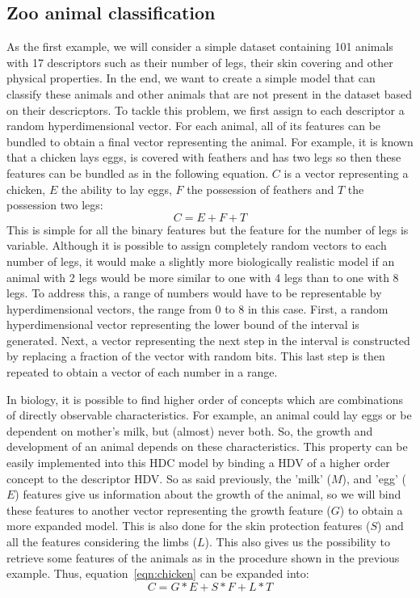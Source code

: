 \subsection*{Zoo animal classification}
As the first example, we will consider a simple dataset\cite{zoo} containing 101 animals with 17 descriptors such as their number of legs, their skin covering and other physical properties. In the end, we want to create a simple model that can classify these animals and other animals that are not present in the dataset based on their descricptors. To tackle this problem, we first assign to each descriptor a random hyperdimensional vector. For each animal, all of its features can be bundled to obtain a final vector representing the animal. For example, it is known that a chicken lays eggs, is covered with feathers and has two legs so then these features can be bundled as in the following equation. $C$ is a vector representing a chicken, $E$ the ability to lay eggs, $F$ the possession of feathers and $T$ the possession two legs:
\begin{equation}\label{eqn:chicken}
    C = E + F + T
\end{equation}
This is simple for all the binary features but the feature for the number of legs is variable. Although it is possible to assign completely random vectors to each number of legs, it would make a slightly more biologically realistic model if an animal with 2 legs would be more similar to one with 4 legs than to one with 8 legs. To address this, a range of numbers would have to be representable by hyperdimensional vectors, the range from 0 to 8 in this case. First, a random hyperdimensional vector representing the lower bound of the interval is generated. Next, a vector representing the next step in the interval is constructed by replacing a fraction of the vector with random bits. This last step is then repeated to obtain a vector of each number in a range.

In biology, it is possible to find higher order of concepts which are combinations of directly observable characteristics. For example, an animal could lay eggs or be dependent on mother's milk, but (almost) never both. So, the growth and development of an animal depends on these characteristics. This property can be easily implemented into this HDC model by binding a HDV of a higher order concept to the descriptor HDV. So as said previously, the 'milk' ($M$), and 'egg' ($E$) features give us information about the growth of the animal, so we will bind these features to another vector representing the growth feature ($G$) to obtain a more expanded model. This is also done for the skin protection features ($S$) and all the features considering the limbs ($L$). This also gives us the possibility to retrieve some features of the animals as in the procedure shown in the previous example. Thus, equation~\ref{eqn:chicken} can be expanded into:
\begin{equation}
    C = G*E + S*F + L*T
\end{equation}

